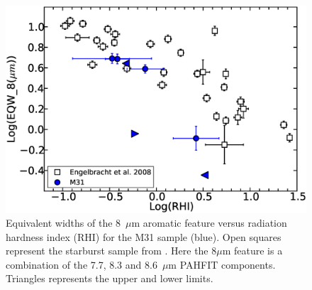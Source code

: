 %
%
\begin{figure}
\centering
\includegraphics[scale=0.25]{./englvsmy.eps}
\caption{Equivalent widths of the 8~$\mu$m aromatic feature versus radiation hardness index (RHI) for the M31 sample (blue). 
Open squares represent the starburst sample from \citet{Engelbracht_2008}. 
Here the 8$\mu$m feature is a combination of the 7.7, 8.3 and 8.6~$\mu$m PAHFIT components. 
Triangles represents the upper and lower limits.}\label{II}
\label{englII}
\end{figure}

